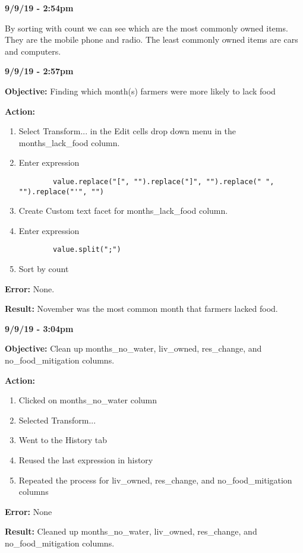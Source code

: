 \documentclass{article}
\begin{document}
\textbf{9/9/19 - 2:54pm}

By sorting with count we can see which are the most commonly owned items. They are the mobile phone and radio. The least commonly owned items are cars and computers.

\textbf{9/9/19 - 2:57pm}

\textbf{Objective:} Finding which month(s) farmers were more likely to lack food

\textbf{Action:}

\begin{enumerate}
    \item Select Transform... in the Edit cells drop down menu in the months\_lack\_food column.
    \item Enter expression \begin{verbatim}
        value.replace("[", "").replace("]", "").replace(" ", "").replace("'", "")
    \end{verbatim}
    \item Create Custom text facet for months\_lack\_food column.
    \item Enter expression \begin{verbatim}
        value.split(";")
    \end{verbatim}
    \item Sort by count
\end{enumerate}

\textbf{Error:} None.

\textbf{Result:} November was the most common month that farmers lacked food.

\textbf{9/9/19 - 3:04pm}

\textbf{Objective:} Clean up months\_no\_water, liv\_owned, res\_change, and no\_food\_mitigation columns.

\textbf{Action:}

\begin{enumerate}
    \item Clicked on months\_no\_water column
    \item Selected Transform...
    \item Went to the History tab
    \item Reused the last expression in history
    \item Repeated the process for liv\_owned, res\_change, and no\_food\_mitigation columns
\end{enumerate}

\textbf{Error:} None

\textbf{Result:} Cleaned up months\_no\_water, liv\_owned, res\_change, and no\_food\_mitigation columns.
\end{document}
